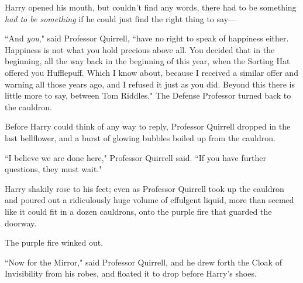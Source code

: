 Harry opened his mouth, but couldn't find any words, there had to be something \emph{had to be something} if he could just find the right thing to say—

``And \emph{you}," said Professor Quirrell, ``have no right to speak of happiness either. Happiness is not what you hold precious above all. You decided that in the beginning, all the way back in the beginning of this year, when the Sorting Hat offered you Hufflepuff. Which I know about, because I received a similar offer and warning all those years ago, and I refused it just as you did. Beyond this there is little more to say, between Tom Riddles." The Defense Professor turned back to the cauldron.

Before Harry could think of any way to reply, Professor Quirrell dropped in the last bellflower, and a burst of glowing bubbles boiled up from the cauldron.

``I believe we are done here," Professor Quirrell said. ``If you have further questions, they must wait."

Harry shakily rose to his feet; even as Professor Quirrell took up the cauldron and poured out a ridiculously huge volume of effulgent liquid, more than seemed like it could fit in a dozen cauldrons, onto the purple fire that guarded the doorway.

The purple fire winked out.

``Now for the Mirror," said Professor Quirrell, and he drew forth the Cloak of Invisibility from his robes, and floated it to drop before Harry's shoes.

